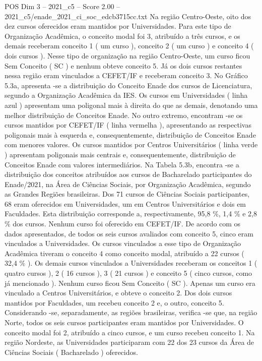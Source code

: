 \begin{textsample}{POS Dim 3 – 2021\_c5 – Score 2.00 – 2021\_c5/enade\_2021\_ci\_soc\_edcb3715cc.txt}
Na região Centro-Oeste, oito dos dez cursos oferecidos eram mantidos por Universidades.
Para este tipo de Organização Acadêmica, o conceito modal foi 3, atribuído a três cursos, e os demais receberam conceito 1 ( um curso ), conceito 2 ( um curso ) e conceito 4 ( dois cursos ).
Nesse tipo de organização na região Centro-Oeste, um curso ficou Sem Conceito ( SC ) e nenhum obteve conceito 5.
Já os dois cursos restantes nessa região eram vinculados a CEFET/IF e receberam conceito 3.
No Gráfico 5.3a, apresenta -se a distribuição do Conceito Enade dos cursos de Licenciatura, segundo a Organização Acadêmica da IES.
Os cursos em Universidades ( linha azul ) apresentam uma poligonal mais à direita do que as demais, denotando uma melhor distribuição de Conceitos Enade.
No outro extremo, encontram -se os cursos mantidos por CEFET/IF ( linha vermelha ), apresentando as respectivas poligonais mais à esquerda e, consequentemente, distribuição de Conceitos Enade com menores valores.
Os cursos mantidos por Centros Universitários ( linha verde ) apresentam poligonais mais centrais e, consequentemente, distribuição de Conceitos Enade com valores intermediários.
Na Tabela 5.3b, encontra -se a distribuição dos conceitos atribuídos aos cursos de Bacharelado participantes do Enade/2021, na Área de Ciências Sociais, por Organização Acadêmica, segundo as Grandes Regiões brasileiras.
Dos 71 cursos de Ciências Sociais participantes, 68 eram oferecidos em Universidades, um em Centros Universitários e dois em Faculdades.
Esta distribuição corresponde a, respectivamente, 95,8 \%, 1,4 \% e 2,8 \% dos cursos.
Nenhum curso foi oferecido em CEFET/IF.
De acordo com os dados apresentados, de todos os seis cursos avaliados com conceito 5, cinco eram vinculados a Universidades.
Os cursos vinculados a esse tipo de Organização Acadêmica tiveram o conceito 4 como conceito modal, atribuído a 22 cursos ( 32,4 \% ).
Os demais cursos vinculados a Universidades receberam os conceitos 1 ( quatro cursos ), 2 ( 16 cursos ), 3 ( 21 cursos ) e conceito 5 ( cinco cursos, como já mencionado ).
Nenhum curso ficou Sem Conceito ( SC ).
Apenas um curso era vinculado a Centros Universitários, e obteve o conceito 2.
Dos dois cursos mantidos por Faculdades, um recebeu conceito 2 e, o outro, conceito 5.
Considerando -se, separadamente, as regiões brasileiras, verifica -se que, na região Norte, todos os seis cursos participantes eram mantidos por Universidades.
O conceito modal foi 2, atribuído a cinco cursos, e um curso recebeu conceito 1.
Na região Nordeste, as Universidades participaram com 22 dos 23 cursos da Área de Ciências Sociais ( Bacharelado ) oferecidos.

\end{textsample}
